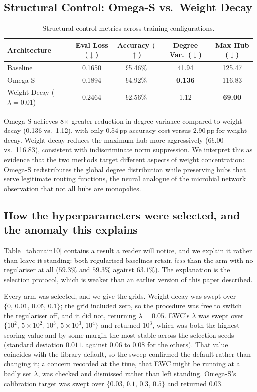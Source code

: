 \documentclass[11pt,a4paper]{article}
\begin{document}
\subsection{Structural Control: Omega-S vs.\ Weight Decay}

\begin{table}[ht]
\centering
\caption{Structural control metrics across training configurations.}
\label{tab:structural}
\begin{tabular}{lcccc}
\toprule
Architecture & Eval Loss ($\downarrow$) & Accuracy ($\uparrow$) &
Degree Var.\ ($\downarrow$) & Max Hub ($\downarrow$) \\
\midrule
Baseline             & 0.1650 & 95.46\% & 41.94  & 125.47 \\
Omega-S              & 0.1894 & 94.92\% & \textbf{0.136} & 116.83 \\
Weight Decay ($\lambda{=}0.01$) & 0.2464 & 92.56\% & 1.12 & \textbf{69.00} \\
\bottomrule
\end{tabular}
\end{table}

Omega-S achieves 8$\times$ greater reduction in degree variance compared
to weight decay (0.136 vs.\ 1.12), with only 0.54\,pp accuracy cost
versus 2.90\,pp for weight decay. Weight decay reduces the maximum hub
more aggressively (69.00 vs.\ 116.83), consistent with indiscriminate norm
suppression. We interpret this as evidence that the two methods target
different aspects of weight concentration: Omega-S redistributes the global
degree distribution while preserving hubs that serve legitimate routing
functions, the neural analogue of the microbial network observation that
not all hubs are monopolies.

\subsection{How the hyperparameters were selected, and the anomaly this explains}
\label{sec:tuning}

Table~\ref{tab:main10} contains a result a reader will notice, and we explain it
rather than leave it standing: both regularised baselines retain \emph{less}
than the arm with no regulariser at all ($59.3\%$ and $59.3\%$ against
$63.1\%$). The explanation is the selection protocol, which is weaker than an
earlier version of this paper described.

Every arm was selected, and we give the grids. Weight decay was swept over
$\{0,\,0.01,\,0.05,\,0.1\}$; the grid included zero, so the procedure was free
to switch the regulariser off, and it did not, returning $\lambda = 0.05$.
EWC's $\lambda$ was swept over $\{10^2,\,5{\times}10^2,\,10^3,\,5{\times}10^3,\,
10^4\}$ and returned $10^3$, which was both the highest-scoring value and by
some margin the most stable across the selection seeds (standard deviation
$0.011$, against $0.06$ to $0.08$ for the others). That value coincides with
the library default, so the sweep confirmed the default rather than changing
it; a concern recorded at the time, that EWC might be running at a badly set
$\lambda$, was checked and dismissed rather than left standing. Omega-S's
calibration target was swept over $\{0.03,\,0.1,\,0.3,\,0.5\}$ and returned
$0.03$.
\end{document}
